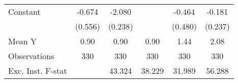 {\begin{tabular}{l*{5}{c}}
\addlinespace
Constant            &      -0.674         &      -2.080\sym{***}&                     &      -0.464         &      -0.181         \\
                    &     (0.556)         &     (0.238)         &                     &     (0.480)         &     (0.237)         \\
\midrule
Mean Y              &        0.90         &        0.90         &        0.90         &        1.44         &        2.08         \\
Observations        &         330         &         330         &         330         &         330         &         330         \\
Exc. Inst. F-stat   &                     &      43.324         &      38.229         &      31.989         &      56.288         \\
\bottomrule
\end{tabular}
}
